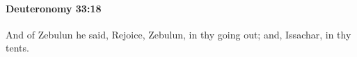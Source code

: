 
		\paragraph{Deuteronomy 33:18} %
			\label{DEUTERONOMY-33-18}

			And of Zebulun he said, Rejoice, Zebulun, in thy going out; and, Issachar, in thy tents.


